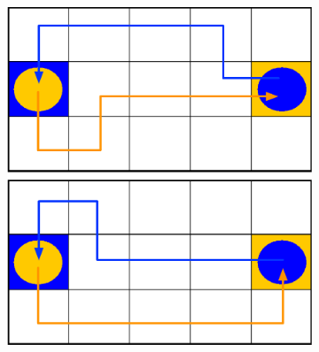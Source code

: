 \begin{figure}
\begin{subfigure}[b]{0.18\textwidth}
        \caption{}
        \label{fig:inter2}
    \end{subfigure}
    ~ %
    \begin{subfigure}[b]{0.18\textwidth}
        \includegraphics[width=\textwidth]{figures/interactive3}
        \caption{}
        \label{fig:inter3}
    \end{subfigure}
	~ %
    \begin{subfigure}[b]{0.18\textwidth}

\end{subfigure}
\end{figure}
